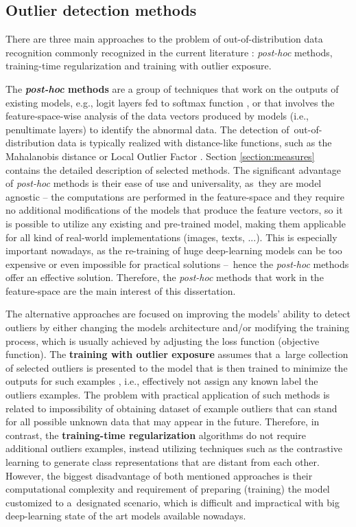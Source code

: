 \subsection{Outlier detection methods}
\label{section:outlier-detection-methods}

There are three main approaches to the problem of out-of-distribution data recognition commonly recognized in the current literature \cite{Yang-2022}: \textit{post-hoc} methods, training-time regularization and training with outlier exposure.

The \textbf{\textit{post-hoc} methods} are a group of techniques that work on the outputs of existing models, e.g., logit layers fed to softmax function \cite{Bridle-1989}, or that involves the feature-space-wise analysis of the data vectors produced by models (i.e., penultimate layers) to identify the abnormal data. The detection of~out-of-distribution data is typically realized with distance-like functions, such as the Mahalanobis distance \cite{Mahalanobis-1936} or Local Outlier Factor \cite{Breunig-2000}. Section \ref{section:measures} contains the detailed description of selected methods. The significant advantage of \textit{post-hoc} methods is their ease of use and universality, as~they are model agnostic – the computations are performed in the feature-space and they require no additional modifications of the models that produce the feature vectors, so it is possible to utilize any existing and pre-trained model, making them applicable for all kind of real-world implementations (images, texts, ...). This is especially important nowadays, as the re-training of huge deep-learning models can be too expensive or even impossible for practical solutions –~hence the \textit{post-hoc} methods offer an effective solution. Therefore, the \textit{post-hoc} methods that work in the feature-space are the main interest of this dissertation.

The alternative approaches are focused on improving the models' ability to detect outliers by either changing the models architecture and/or modifying the training process, which is usually achieved by adjusting the loss function (objective function). The \textbf{training with outlier exposure} assumes that a~large collection of selected outliers is presented to the model that is then trained to minimize the outputs for such examples \cite{Hendrycks-2019}, i.e., effectively not assign any known label the outliers examples. The problem with practical application of such methods is related to impossibility of obtaining dataset of example outliers that can stand for all possible unknown data that may appear in the future. Therefore, in contrast, the \textbf{training-time regularization} algorithms do not require additional outliers examples, instead utilizing techniques such as the contrastive learning \cite{Tack-2020} to generate class representations that are distant from each other. However, the biggest disadvantage of both mentioned approaches is their computational complexity and requirement of preparing (training) the model customized to a~designated scenario, which is difficult and impractical with big deep-learning state of the art models available nowadays.



